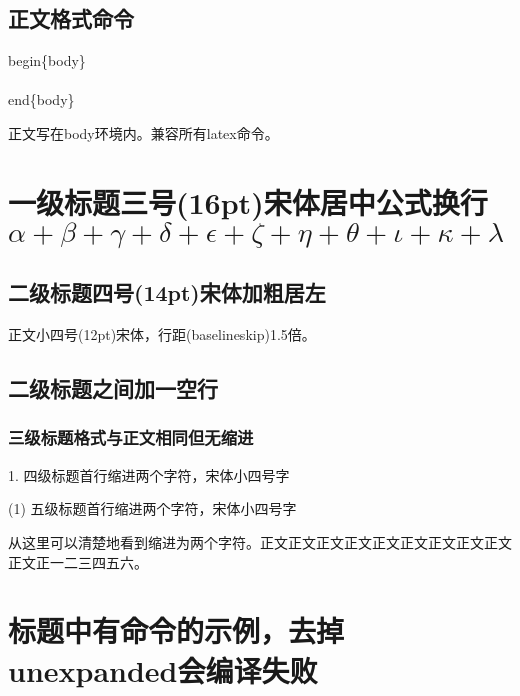 \documentclass[a4paper]{article}
\begin{document}
	\subsection{正文格式命令}
	\begin{body}
		{\color{purple}\noindent{\bslash}begin\{{\color{teal}body}\}}\\
		\\
		{\color{purple}{\bslash}end\{{\color{teal}body}\}}\par
		正文写在body环境内。兼容所有latex命令。\par
	\end{body}
	\section{一级标题三号(16pt)宋体居中公式换行$\alpha+\beta+\gamma+\delta+\epsilon+\zeta+\eta+\theta+\iota+\kappa+\lambda$}
	\subsection{二级标题四号(14pt)宋体加粗居左}
	\begin{body}
		正文小四号(12pt)宋体，行距(baselineskip)1.5倍。\par
	\end{body}
	\subsection{二级标题之间加一空行}
	\subsubsection{三级标题格式与正文相同但无缩进}
	\begin{body}
		1. 四级标题首行缩进两个字符，宋体小四号字\par
		(1) 五级标题首行缩进两个字符，宋体小四号字\par
		从这里可以清楚地看到缩进为两个字符。正文正文正文正文正文正文正文正文正文正文正一二三四五六。\par
	\end{body}
	\section[fragile1]{标题中有命令的示例，去掉unexpanded会编译失败}
\end{document}
